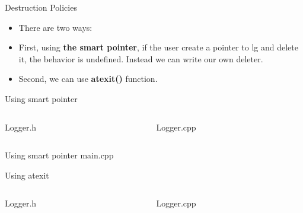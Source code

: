 \documentclass[13pt]{beamer}
\begin{document}
\begin{frame}{Destruction Policies}
\begin{itemize}
\setlength\itemsep{1em}

\item There are two ways:

\item First, using \textbf{the smart pointer}, if the user create a pointer to lg and delete it, the behavior is undefined. Instead we can write our own deleter.

\item Second, we can use \textbf{atexit()} function.
\end{itemize}
\end{frame}

\begin{frame}{Using smart pointer}
\begin{columns}[T]
\begin{column}{.48\textwidth}
Logger.h
\lstset{basicstyle=\tiny,style=myCustomCppStyle}

\end{column}

\begin{column}{.48\textwidth}
Logger.cpp
\lstset{basicstyle=\tiny,style=myCustomCppStyle}

\end{column}
\end{columns}
\end{frame}

\begin{frame}{Using smart pointer}
main.cpp
\lstset{basicstyle=\tiny,style=myCustomCppStyle}

\end{frame}

\begin{frame}{Using atexit}
\begin{columns}[T]
\begin{column}{.48\textwidth}
Logger.h
\lstset{basicstyle=\tiny,style=myCustomCppStyle}

\end{column}

\begin{column}{.48\textwidth}
Logger.cpp
\lstset{basicstyle=\tiny,style=myCustomCppStyle}

\end{column}
\end{columns}
\end{frame}
\end{document}
